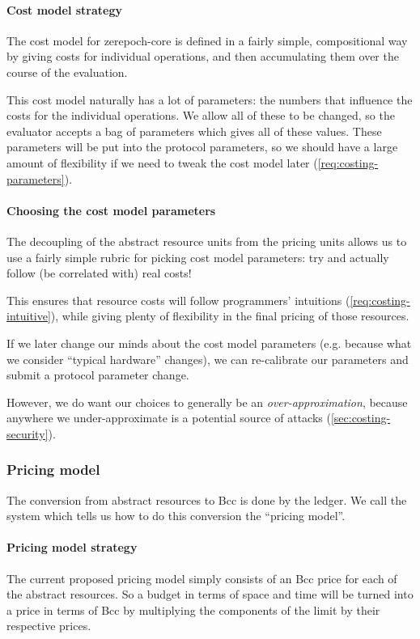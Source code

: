\paragraph{Cost model strategy}
The cost model for \gls{zerepoch-core} is defined in a fairly simple, compositional way by giving costs for individual operations, and then accumulating them over the course of the evaluation.

This cost model naturally has a lot of parameters: the numbers that influence the costs for the individual operations.
We allow all of these to be changed, so the evaluator accepts a bag of parameters which gives all of these values.
These parameters will be put into the protocol parameters, so we should have a large amount of flexibility if we need to tweak the cost model later (\cref{req:costing-parameters}).

\paragraph{Choosing the cost model parameters}
The decoupling of the abstract resource units from the pricing units allows us to use a fairly simple rubric for picking cost model parameters: try and actually follow (be correlated with) real costs!

This ensures that resource costs will follow programmers' intuitions (\cref{req:costing-intuitive}), while giving plenty of flexibility in the final pricing of those resources.

If we later change our minds about the cost model parameters (e.g. because what we consider ``typical hardware'' changes), we can re-calibrate our parameters and submit a protocol parameter change.

However, we do want our choices to generally be an \emph{over-approximation}, because anywhere we under-approximate is a potential source of attacks (\cref{sec:costing-security}).

\subsubsection{Pricing model}
The conversion from abstract resources to Bcc is done by the ledger.
We call the system which tells us how to do this conversion the ``pricing model''.

\paragraph{Pricing model strategy}
The current proposed pricing model simply consists of an Bcc price for each of the abstract resources.
So a budget in terms of \gls{space} and \gls{time} will be turned into a price in terms of Bcc by multiplying the components of the limit by their respective prices.

